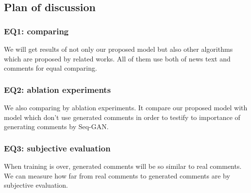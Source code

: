 \subsection{Plan of discussion}
\subsubsection{EQ1: comparing}
We will get results of not only our proposed model but also other algorithms which are proposed by related works.
All of them use both of news text and comments for equal comparing.
\subsubsection{EQ2: ablation experiments}
We also comparing by ablation experiments.
It compare our proposed model with model which don't use generated comments in order to
testify to importance of generating comments by Seq-GAN.
\subsubsection{EQ3: subjective evaluation}
When training is over, generated comments will be so similar to real comments.
We can measure how far from real comments to generated comments are by subjective evaluation.